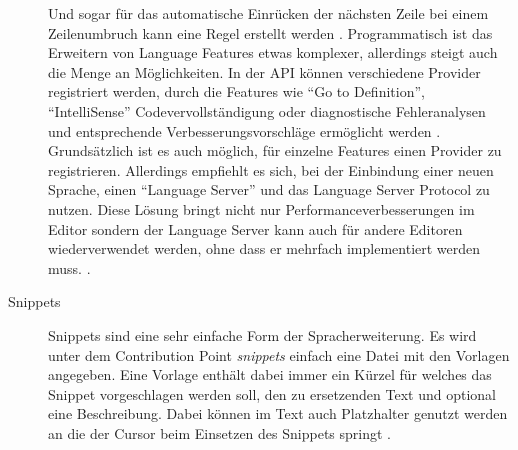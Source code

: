 \begin{description}
      Und sogar für das automatische Einrücken der nächsten Zeile bei einem Zeilenumbruch kann eine Regel erstellt werden
      \cite{VSCodeExtensionAPILanguageConfigurationGuide}.
      Programmatisch ist das Erweitern von Language Features etwas komplexer, allerdings steigt auch die
      Menge an Möglichkeiten. In der API können verschiedene Provider registriert werden, durch die Features wie
      \enquote{Go to Definition}, \enquote{IntelliSense} Codevervollständigung oder diagnostische Fehleranalysen und
      entsprechende Verbesserungsvorschläge ermöglicht werden
      \cite{VSCodeExtensionAPIProgrammaticLanguageFeatures}. 
      Grundsätzlich ist es auch möglich, für einzelne
      Features einen Provider zu registrieren. Allerdings empfiehlt es sich, bei der Einbindung einer neuen
      Sprache, einen \enquote{Language Server} und das Language Server Protocol zu nutzen. Diese Lösung
      bringt nicht nur Performanceverbesserungen im Editor sondern der Language Server kann auch für 
      andere Editoren wiederverwendet werden, ohne dass er mehrfach implementiert werden muss. \cite{GunasingheNadeeshaan2022Lspa}.
    \item[Snippets] 
      Snippets sind eine sehr einfache Form der Spracherweiterung. Es wird unter dem Contribution Point
      \emph{snippets} einfach eine Datei mit den Vorlagen angegeben. Eine Vorlage enthält dabei immer
      ein Kürzel für welches das Snippet vorgeschlagen werden soll, den zu ersetzenden Text und optional
      eine Beschreibung. Dabei können im Text auch Platzhalter genutzt werden an die der Cursor beim Einsetzen
      des Snippets springt
      \cite{VSCodeExtensionAPISnippetGuide}.
  \end{description}
